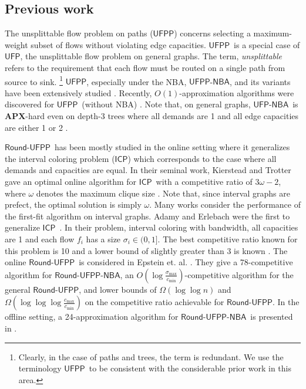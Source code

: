 \documentclass[a4paper,UKenglish]{lipics-v2016}
\newcommand{\ufp}{\mbox{$\mathsf{UFP}$}}
\newcommand{\ufpp}{\mbox{$\mathsf{UFPP}$}}
\newcommand{\ufpnba}{\mbox{$\mathsf{UFP}$-$\mathsf{NBA}$}}
\newcommand{\ufppnba}{\mbox{$\mathsf{UFPP}$-$\mathsf{NBA}$}}
\newcommand{\rufpp}{\mbox{$\mathsf{Round}$-$\mathsf{UFPP}$}}
\newcommand{\rufppnba}{\mbox{$\mathsf{Round}$-$\mathsf{UFPP}$-$\mathsf{NBA}$}}
\newcommand{\icp}{\mbox{$\mathsf{ICP}$}}
\theoremstyle{plain}
\begin{document}
\subsection{Previous work}\label{prev}
The unsplittable flow problem on paths (\ufpp) concerns selecting a maximum-weight subset of flows without violating edge capacities.  \ufpp\ is a special case of \ufp, the unsplittable flow problem on general graphs.  The term, \emph{unsplittable} refers to the requirement that each flow must be routed on a single path from source to sink. \footnote{Clearly, in the case of paths and trees, the term is redundant.  We use the terminology \ufpp\ to be consistent with the considerable prior work in this area.} \ufpp, especially under the NBA, \ufppnba, and its variants have been extensively studied \cite{temporalk,ARKIN19871,Salavatipour,Bansal-Epstein,Bar-Noy, Calinescu,DARMANN,Phillips,Chekuri2003}. Recently, $O(1)$-approximation algorithms were discovered for \ufpp\ (without NBA) \cite{bonsama,mazing}. Note that, on general graphs, \ufpnba\ is $\mathbf{APX}$-hard even on depth-3 trees where all demands are 1 and all edge capacities are either 1 or 2 \cite{Garg1997}.

\rufpp\ has been mostly studied in the online setting where it generalizes the interval coloring problem (\icp) which corresponds to the case where all demands and capacities are equal. In their seminal work, Kierstead and Trotter gave an optimal online algorithm for \icp\ with a competitive ratio of $3\omega - 2$, where $\omega$ denotes the maximum clique size \cite{KT}. Note that, since interval graphs are prefect, the optimal solution is simply $\omega$. Many works consider the performance of the first-fit algorithm on interval graphs. Adamy and Erlebach were the first to generalize \icp\ \cite{Adamy2004}. In their problem, interval coloring with bandwidth, all capacities are 1 and each flow $f_i$ has a size $\sigma_i \in (0,1]$. The best competitive ratio known for this problem is 10 \cite{AZAR200618,Epstein2005} and a lower bound of slightly greater than 3 is known \cite{linearityofFF}. The online \rufpp\ is considered in Epstein et. al. \cite{epstein}. They give a 78-competitive algorithm for \rufppnba, an $O(\log \frac{\sigma_{\max}}{c_{\min}})$-competitive algorithm for the general \rufpp, and lower bounds of $\Omega(\log\log n)$ and $\Omega(\log\log\log \frac{c_{\max}}{c_{\min}})$ on the competitive ratio achievable for \rufpp. In the offline setting, a 24-approximation algorithm for \rufppnba\ is presented in \cite{Elbassioni}.
\end{document}

